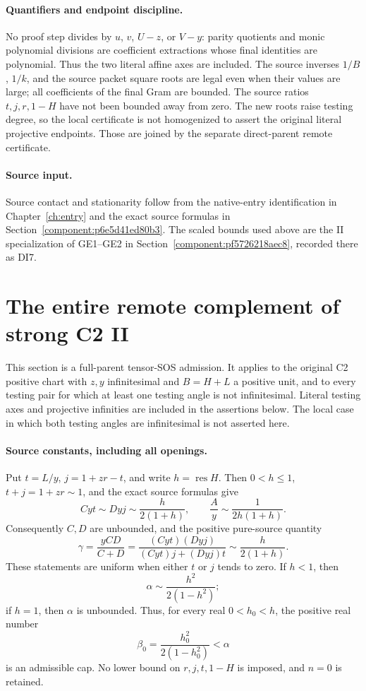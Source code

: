 \paragraph{Quantifiers and endpoint discipline.}
No proof step divides by $u$, $v$, $U-z$, or $V-y$: parity quotients
and monic polynomial divisions are coefficient extractions whose
final identities are polynomial.  Thus the two literal affine axes
are included.  The source inverses $1/B$, $1/k$, and the source
packet square roots are legal even when their values are large;
all coefficients of the final Gram are bounded.  The source ratios
$t,j,r,1-H$ have not been bounded away from zero.  The new roots
raise testing degree, so the local certificate is not homogenized
to assert the original literal projective endpoints.  Those are
joined by the separate direct-parent remote certificate.

\paragraph{Source input.}
Source contact and stationarity follow from the native-entry identification in Chapter~\ref{ch:entry} and the exact source formulas in Section~\ref{component:p6e5d41ed80b3}. The scaled bounds used above are the II specialization of GE1--GE2 in Section~\ref{component:pf5726218aec8}, recorded there as DI7.


\section{\texorpdfstring{The entire remote complement of strong C2 II}{The entire remote complement of strong C2 II}}
\label{component:p590112f102bd}

\label{p590112f102bd:sec:r7-c2-remote}

This section is a full-parent tensor-SOS admission.  It applies to the
original C2 positive chart with $z,y$ infinitesimal and $B=H+L$ a
positive unit, and to every testing pair for which at least one testing
angle is not infinitesimal.  Literal testing axes and projective
infinities are included in the assertions below.  The local case in
which both testing angles are infinitesimal is not asserted here.

\paragraph{Source constants, including all openings.}
Put $t=L/y$, $j=1+zr-t$, and write $h=\operatorname{res}H$.
Then $0<h\leq1$, $t+j=1+zr\sim1$, and the exact source formulas give
\[
 Cyt\sim Dyj\sim\frac{h}{2(1+h)},\qquad
 \frac Ay\sim\frac1{2h(1+h)}.
\]
Consequently $C,D$ are unbounded, and the positive pure-source quantity
\[
 \gamma=\frac{yCD}{C+D}
 =\frac{(Cyt)(Dyj)}{(Cyt)j+(Dyj)t}
 \sim\frac{h}{2(1+h)}.                                      \tag{RR1}
\]
These statements are uniform when either $t$ or $j$ tends to zero.
If $h<1$, then
\[
 \alpha\sim\frac{h^2}{2(1-h^2)};
\]
if $h=1$, then $\alpha$ is unbounded.  Thus, for every real
$0<h_0<h$, the positive real number
\[
 \beta_0=\frac{h_0^2}{2(1-h_0^2)}<\alpha                     \tag{RR2}
\]
is an admissible cap.  No lower bound on $r,j,t,1-H$ is imposed,
and $n=0$ is retained.

